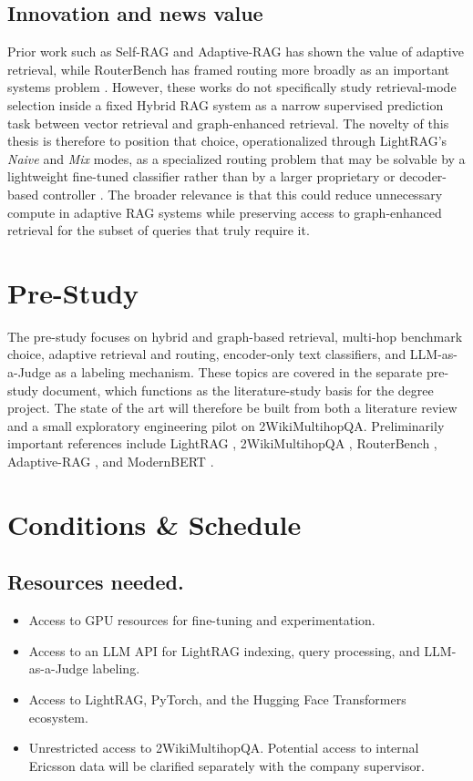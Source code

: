 \documentclass[11pt, a4paper]{article}
\begin{document}
\subsection{Innovation and news value} Prior work such as Self-RAG and Adaptive-RAG has shown the value of adaptive retrieval, while RouterBench has framed routing more broadly as an important systems problem \cite{asai2023selfrag,jeong2024adaptiverag,hu2024routerbench}. However, these works do not specifically study retrieval-mode selection inside a fixed Hybrid RAG system as a narrow supervised prediction task between vector retrieval and graph-enhanced retrieval. The novelty of this thesis is therefore to position that choice, operationalized through LightRAG's \emph{Naive} and \emph{Mix} modes, as a specialized routing problem that may be solvable by a lightweight fine-tuned classifier rather than by a larger proprietary or decoder-based controller \cite{lightrag2024,benayas2024encoder,warner2024modernbert}. The broader relevance is that this could reduce unnecessary compute in adaptive RAG systems while preserving access to graph-enhanced retrieval for the subset of queries that truly require it.

\section{Pre-Study}

The pre-study focuses on hybrid and graph-based retrieval, multi-hop benchmark choice, adaptive retrieval and routing, encoder-only text classifiers, and LLM-as-a-Judge as a labeling mechanism. These topics are covered in the separate pre-study document, which functions as the literature-study basis for the degree project. The state of the art will therefore be built from both a literature review and a small exploratory engineering pilot on 2WikiMultihopQA. Preliminarily important references include LightRAG \cite{lightrag2024}, 2WikiMultihopQA \cite{ho2020twowiki}, RouterBench \cite{hu2024routerbench}, Adaptive-RAG \cite{jeong2024adaptiverag}, and ModernBERT \cite{warner2024modernbert}.

\section{Conditions \& Schedule}

\subsection{Resources needed.}
\begin{itemize}[label=--]
    \item Access to GPU resources for fine-tuning and experimentation.
    \item Access to an LLM API for LightRAG indexing, query processing, and LLM-as-a-Judge labeling.
    \item Access to LightRAG, PyTorch, and the Hugging Face Transformers ecosystem.
    \item Unrestricted access to 2WikiMultihopQA. Potential access to internal Ericsson data will be clarified separately with the company supervisor.
\end{itemize}
\end{document}
